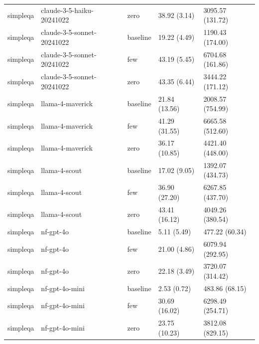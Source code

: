 \begin{table}[htbp]
\begin{tabular}{lllll}
simpleqa & claude-3-5-haiku-20241022 & zero &  38.92 (3.14) & 3095.57 (131.72) \\
simpleqa & claude-3-5-sonnet-20241022 & baseline &  19.22 (4.49) & 1190.43 (174.00) \\
simpleqa & claude-3-5-sonnet-20241022 & few &  43.19 (5.45) & 6704.68 (161.86) \\
simpleqa & claude-3-5-sonnet-20241022 & zero &  43.35 (6.44) & 3444.22 (171.12) \\
simpleqa & llama-4-maverick & baseline &  21.84 (13.56) & 2008.57 (754.99) \\
simpleqa & llama-4-maverick & few &  41.29 (31.55) & 6665.58 (512.60) \\
simpleqa & llama-4-maverick & zero &  36.17 (10.85) & 4421.40 (448.00) \\
simpleqa & llama-4-scout & baseline &  17.02 (9.05) & 1392.07 (434.73) \\
simpleqa & llama-4-scout & few &  36.90 (27.20) & 6267.85 (437.70) \\
simpleqa & llama-4-scout & zero &  43.41 (16.12) & 4049.26 (380.54) \\
simpleqa & nf-gpt-4o & baseline &   5.11 (5.49) & 477.22 (60.34) \\
simpleqa & nf-gpt-4o & few &  21.00 (4.86) & 6079.94 (292.95) \\
simpleqa & nf-gpt-4o & zero &  22.18 (3.49) & 3720.07 (314.42) \\
simpleqa & nf-gpt-4o-mini & baseline &   2.53 (0.72) & 483.86 (68.15) \\
simpleqa & nf-gpt-4o-mini & few &  30.69 (16.02) & 6298.49 (254.71) \\
simpleqa & nf-gpt-4o-mini & zero &  23.75 (10.23) & 3812.08 (829.15) \\
\bottomrule
\end{tabular}
\end{table}

